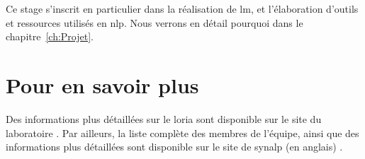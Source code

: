 Ce stage s'inscrit en particulier dans la réalisation de \gls{lm}, et l'élaboration d'outils et ressources utilisés en \gls{nlp}. Nous verrons en détail pourquoi dans le chapitre~\ref{ch:Projet}.

\section*{Pour en savoir plus}
Des informations plus détaillées sur le \gls{loria} sont disponible sur {le site du laboratoire \autocite{about_loria}}.
Par ailleurs, la liste complète des membres de l'équipe, ainsi que des informations plus détaillées sont disponible sur {le site de \gls{synalp} (en anglais) \autocite{about_synalp}}.